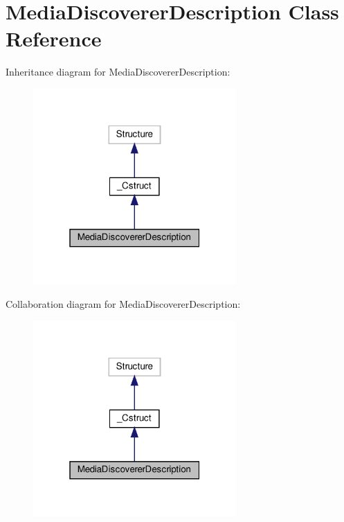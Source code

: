 \hypertarget{classvlc_1_1_media_discoverer_description}{}\section{Media\+Discoverer\+Description Class Reference}
\label{classvlc_1_1_media_discoverer_description}


Inheritance diagram for Media\+Discoverer\+Description\+:
\nopagebreak
\begin{figure}[H]
\begin{center}
\leavevmode
\includegraphics[width=220pt]{classvlc_1_1_media_discoverer_description__inherit__graph}
\end{center}
\end{figure}


Collaboration diagram for Media\+Discoverer\+Description\+:
\nopagebreak
\begin{figure}[H]
\begin{center}
\leavevmode
\includegraphics[width=220pt]{classvlc_1_1_media_discoverer_description__coll__graph}
\end{center}
\end{figure}
